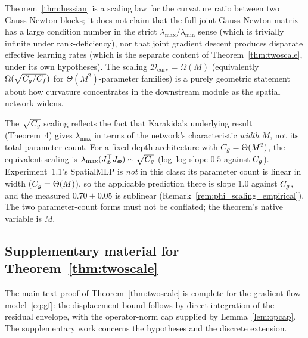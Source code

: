 \begin{remark}
\label{rem:thm1_scope}
Theorem~\ref{thm:hessian} is a scaling law for the curvature ratio
between two Gauss-Newton blocks; it does not claim that the full
joint Gauss-Newton matrix has a large condition number in the strict
$\lambda_{\max}/\lambda_{\min}$ sense (which is trivially infinite
under rank-deficiency), nor that joint gradient descent produces
disparate effective learning rates (which is the separate content of
Theorem~\ref{thm:twoscale}, under its own hypotheses). The scaling
$\mathcal{D}_{\mathrm{curv}} = \Omega(M)$ (equivalently
$\Omega(\sqrt{C_g / C_f})$ for $\Theta(M^2)$-parameter families) is a
purely geometric statement about how curvature concentrates in the
downstream module as the spatial network widens.
\end{remark}

\begin{remark}
The $\sqrt{C_g}$ scaling reflects the fact that Karakida's
underlying result~\cite{karakida2019universal} (Theorem~4) gives
$\lambda_{\max}$ in terms of the network's characteristic
\emph{width} $M$, not its total parameter count. For a fixed-depth
architecture with $C_g = \Theta(M^2)$, the equivalent scaling is
$\lambda_{\max}(J_{\boldsymbol{\phi}}^\top J_{\boldsymbol{\phi}}) \sim \sqrt{C_g}$
(log--log slope $0.5$ against $C_g$). Experiment~1.1's SpatialMLP is
\emph{not} in this class: its parameter count is linear in width
($C_g = \Theta(M)$), so the applicable prediction there is slope
$1.0$ against $C_g$, and the measured $0.70 \pm 0.05$ is sublinear
(Remark~\ref{rem:phi_scaling_empirical}). The two parameter-count
forms must not be conflated; the theorem's native variable is $M$.
\end{remark}


\subsection{Supplementary material for Theorem~\ref{thm:twoscale}}
\label{sec:proof_thm2}

The main-text proof of Theorem~\ref{thm:twoscale} is complete for the
gradient-flow model~\eqref{eq:gf}: the displacement bound follows by
direct integration of the residual envelope, with the operator-norm
cap supplied by Lemma~\ref{lem:opcap}. The supplementary work
concerns the hypotheses and the discrete extension.

